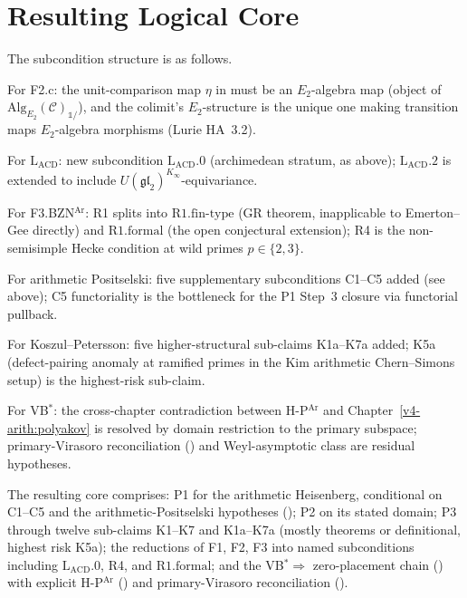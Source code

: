 \section{Resulting Logical Core}
\label{v4-arith:sw:wave2-corrections}

The subcondition structure is as follows.

For F2.c: the unit-comparison map \(\eta\) in
 must be an \(E_{2}\)-algebra map
(object of \(\mathrm{Alg}_{E_{2}}(\mathcal{C})_{\mathbb{1}/}\)),
and the colimit's \(E_{2}\)-structure is the unique one making
transition maps \(E_{2}\)-algebra morphisms (Lurie HA~3.2).

For \(\mathrm{L}_{\mathrm{ACD}}\): new subcondition
\(\mathrm{L}_{\mathrm{ACD}}.0\) (archimedean stratum, as above);
\(\mathrm{L}_{\mathrm{ACD}}.2\) is extended to include
\(U(\mathfrak{gl}_{2})^{K_{\infty}}\)-equivariance.

For F3.BZN\(^{\mathrm{Ar}}\): R1 splits into
\(\mathrm{R1.fin\text{-}type}\) (GR theorem, inapplicable to
Emerton--Gee directly) and \(\mathrm{R1.formal}\) (the open
conjectural extension); R4 is the non-semisimple
Hecke condition at wild primes \(p\in\{2,3\}\).

For arithmetic Positselski: five supplementary subconditions
C1--C5 added (see above); C5 functoriality is the bottleneck for
the P1 Step~3 closure via functorial pullback.

For Koszul--Petersson: five higher-structural sub-claims K1a--K7a
added; K5a (defect-pairing anomaly at ramified primes in the Kim
arithmetic Chern--Simons setup) is the highest-risk sub-claim.

For VB\(^{*}\): the cross-chapter contradiction between
H-P\(^{\mathrm{Ar}}\) and Chapter~\ref{v4-arith:polyakov} is
resolved by domain restriction to the primary subspace;
primary-Virasoro reconciliation ()
and Weyl-asymptotic class are residual hypotheses.

The resulting core comprises:
P1 for the arithmetic Heisenberg, conditional on C1--C5 and the
arithmetic-Positselski hypotheses
();
P2 on its stated domain;
P3 through twelve sub-claims K1--K7 and K1a--K7a (mostly theorems
or definitional, highest risk K5a);
the reductions of F1, F2, F3 into named subconditions
including \(\mathrm{L}_{\mathrm{ACD}}.0\), R4, and
\(\mathrm{R1.formal}\);
and the VB\(^{*}\Rightarrow\) zero-placement chain
() with explicit
H-P\(^{\mathrm{Ar}}\) () and
primary-Virasoro reconciliation
().

